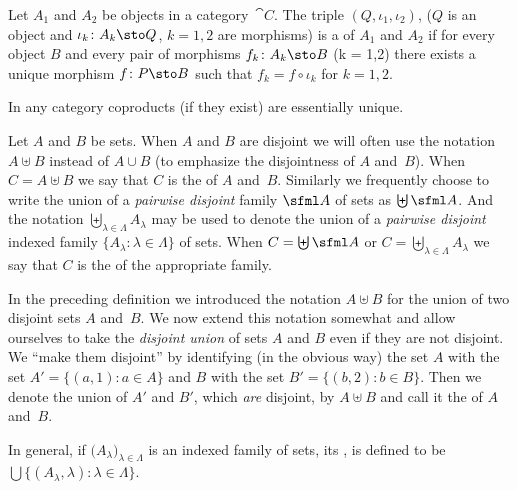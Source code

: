 \begin{defn}\label{C015611} Let $A_1$ and $A_2$ be objects in a category~$\cat C$.  The triple
$(Q,\iota_1,\iota_2)$, ($Q$ is an object and $\iota_k\colon A_k \sto Q$, $k = 1,2$ are morphisms) is a
 of $A_1$ and $A_2$ if for every object $B$ and every pair of morphisms
$f_k\colon A_k \sto B$ (k = 1,2) there exists a unique morphism $f\colon P \sto B$ such
that $f_k = f \circ \iota_k$ for $k = 1,2$.
\end{defn}

\begin{prop} In any category coproducts (if they exist) are
essentially unique.
\end{prop}

\begin{defn}\label{C0006127} Let $A$ and $B$ be sets.  When $A$ and $B$ are disjoint we will
often use the notation
$A \uplus B$ instead of $A \cup B$ (to emphasize the disjointness of $A$ and~$B$). When
$C = A \uplus B$ we say that $C$ is the
 of $A$ and~$B$.  Similarly we frequently choose to write the union of
a \emph{pairwise disjoint} family $\sfml A$ of sets as $\biguplus\sfml A$. And the
notation $\biguplus_{\lambda \in \Lambda} A_\lambda$ may be used to denote the union of a
\emph{pairwise disjoint} indexed family $\{A_\lambda\colon  \lambda \in \Lambda\}$ of
sets. When $C = \biguplus\sfml A$ or $C = \biguplus_{\lambda \in \Lambda} A_\lambda$ we
say that $C$ is the  of the appropriate family.
\end{defn}

\begin{defn} In the preceding definition we introduced the notation $A \uplus B$ for the
union of two disjoint sets $A$ and~$B$.  We now extend this notation somewhat and allow
ourselves to take the \emph{disjoint union} of sets $A$ and $B$ even if they are not
disjoint. We ``make them disjoint'' by identifying (in the obvious way) the set $A$ with the
set $A' = \{(a,1)\colon a \in A\}$ and $B$ with the set $B' = \{(b,2)\colon b \in B\}$.  Then we
denote the union of $A'$ and $B'$, which \emph{are} disjoint, by $A \uplus B$ and call it the
 of $A$ and~$B$.

In general, if $\bigl(A_\lambda\bigr)_{\lambda \in \Lambda}$ is an indexed family of
sets, its
,  is
defined to be $\bigcup \{(A_\lambda,\lambda)\colon \lambda \in \Lambda\}$.
\end{defn}


